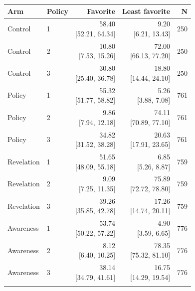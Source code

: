 \begin{tabular}{@{}llrrr@{}}
\toprule
Arm & Policy & Favorite & Least favorite & N \\
\midrule
Control & 1 & \shortstack{58.40\\{[52.21, 64.34]}} & \shortstack{9.20\\{[6.21, 13.43]}} & 250 \\\addlinespace[2pt]
Control & 2 & \shortstack{10.80\\{[7.53, 15.26]}} & \shortstack{72.00\\{[66.13, 77.20]}} & 250 \\\addlinespace[2pt]
Control & 3 & \shortstack{30.80\\{[25.40, 36.78]}} & \shortstack{18.80\\{[14.44, 24.10]}} & 250 \\\addlinespace[2pt]
Policy & 1 & \shortstack{55.32\\{[51.77, 58.82]}} & \shortstack{5.26\\{[3.88, 7.08]}} & 761 \\\addlinespace[2pt]
Policy & 2 & \shortstack{9.86\\{[7.94, 12.18]}} & \shortstack{74.11\\{[70.89, 77.10]}} & 761 \\\addlinespace[2pt]
Policy & 3 & \shortstack{34.82\\{[31.52, 38.28]}} & \shortstack{20.63\\{[17.91, 23.65]}} & 761 \\\addlinespace[2pt]
Revelation & 1 & \shortstack{51.65\\{[48.09, 55.18]}} & \shortstack{6.85\\{[5.26, 8.87]}} & 759 \\\addlinespace[2pt]
Revelation & 2 & \shortstack{9.09\\{[7.25, 11.35]}} & \shortstack{75.89\\{[72.72, 78.80]}} & 759 \\\addlinespace[2pt]
Revelation & 3 & \shortstack{39.26\\{[35.85, 42.78]}} & \shortstack{17.26\\{[14.74, 20.11]}} & 759 \\\addlinespace[2pt]
Awareness & 1 & \shortstack{53.74\\{[50.22, 57.22]}} & \shortstack{4.90\\{[3.59, 6.65]}} & 776 \\\addlinespace[2pt]
Awareness & 2 & \shortstack{8.12\\{[6.40, 10.25]}} & \shortstack{78.35\\{[75.32, 81.10]}} & 776 \\\addlinespace[2pt]
Awareness & 3 & \shortstack{38.14\\{[34.79, 41.61]}} & \shortstack{16.75\\{[14.29, 19.54]}} & 776 \\\addlinespace[2pt]
\bottomrule
\end{tabular}
